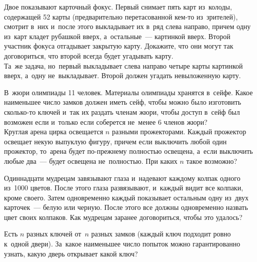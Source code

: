 \begin{problems}
\item
\subproblem
Двое показывают карточный фокус.
Первый снимает пять карт из~колоды, содержащей 52 карты
(предварительно перетасованной кем-то из~зрителей),
смотрит в~них и~после этого выкладывает их в~ряд слева направо, причем одну
из~карт кладет рубашкой вверх, а~остальные~--- картинкой вверх.
Второй участник фокуса отгадывает закрытую карту.
Докажите, что они могут так договориться, что второй всегда будет угадывать
карту.
\\
\subproblem
Та~же задача, но~первый %
выкладывает слева направо четыре карты картинкой вверх, а~одну не~выкладывает.
Второй должен угадать невыложенную карту.

\item
\subproblem
В~жюри олимпиады 11 человек.
Материалы олимпиады хранятся в~сейфе.
Какое наименьшее число замков должен иметь сейф, чтобы можно было изготовить
сколько-то ключей и~так их раздать членам жюри, чтобы доступ в~сейф был
возможен если и~только если соберется не~менее 6 членов жюри?
\\
\subproblem
Круглая арена цирка освещается $n$ разными прожекторами.
Каждый прожектор освещает некую выпуклую фигуру, причем если выключить любой
один прожектор, то~арена будет по-прежнему полностью освещена, а~если выключить
любые два~--- будет освещена не~полностью.
При каких $n$ такое возможно?

\itemx{*}
Одиннадцати мудрецам завязывают глаза и~надевают каждому колпак одного из~1000
цветов.
После этого глаза развязывают, и~каждый видит все колпаки, кроме своего.
Затем одновременно каждый показывает остальным одну из~двух карточек~--- белую
или черную.
После этого все должны одновременно назвать цвет своих колпаков.
Как мудрецам заранее договориться, чтобы это удалось?

\itemx{*}
Есть $n$ разных ключей от~$n$ разных замков
(каждый ключ подходит ровно к~одной двери).
За~какое наименьшее число попыток можно гарантированно узнать, какую дверь
открывает какой ключ?

\end{problems}

